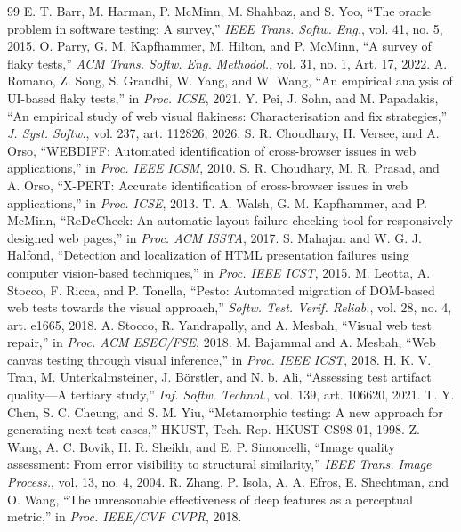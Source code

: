 \documentclass[conference]{IEEEtran}
\begin{document}
\begin{thebibliography}{99}\footnotesize
{} E. T. Barr, M. Harman, P. McMinn, M. Shahbaz, and S. Yoo, ``The oracle problem in software testing: A survey,'' \emph{IEEE Trans. Softw. Eng.}, vol. 41, no. 5, 2015.
 O. Parry, G. M. Kapfhammer, M. Hilton, and P. McMinn, ``A survey of flaky tests,'' \emph{ACM Trans. Softw. Eng. Methodol.}, vol. 31, no. 1, Art. 17, 2022.
 A. Romano, Z. Song, S. Grandhi, W. Yang, and W. Wang, ``An empirical analysis of UI-based flaky tests,'' in \emph{Proc. ICSE}, 2021.
 Y. Pei, J. Sohn, and M. Papadakis, ``An empirical study of web visual flakiness: Characterisation and fix strategies,'' \emph{J. Syst. Softw.}, vol. 237, art. 112826, 2026.
 S. R. Choudhary, H. Versee, and A. Orso, ``WEBDIFF: Automated identification of cross-browser issues in web applications,'' in \emph{Proc. IEEE ICSM}, 2010.
 S. R. Choudhary, M. R. Prasad, and A. Orso, ``X-PERT: Accurate identification of cross-browser issues in web applications,'' in \emph{Proc. ICSE}, 2013.
 T. A. Walsh, G. M. Kapfhammer, and P. McMinn, ``ReDeCheck: An automatic layout failure checking tool for responsively designed web pages,'' in \emph{Proc. ACM ISSTA}, 2017.
 S. Mahajan and W. G. J. Halfond, ``Detection and localization of HTML presentation failures using computer vision-based techniques,'' in \emph{Proc. IEEE ICST}, 2015.
 M. Leotta, A. Stocco, F. Ricca, and P. Tonella, ``Pesto: Automated migration of DOM-based web tests towards the visual approach,'' \emph{Softw. Test. Verif. Reliab.}, vol. 28, no. 4, art. e1665, 2018.
 A. Stocco, R. Yandrapally, and A. Mesbah, ``Visual web test repair,'' in \emph{Proc. ACM ESEC/FSE}, 2018.
 M. Bajammal and A. Mesbah, ``Web canvas testing through visual inference,'' in \emph{Proc. IEEE ICST}, 2018.
 H. K. V. Tran, M. Unterkalmsteiner, J. B\"orstler, and N. b. Ali, ``Assessing test artifact quality---A tertiary study,'' \emph{Inf. Softw. Technol.}, vol. 139, art. 106620, 2021.
 T. Y. Chen, S. C. Cheung, and S. M. Yiu, ``Metamorphic testing: A new approach for generating next test cases,'' HKUST, Tech. Rep. HKUST-CS98-01, 1998.
 Z. Wang, A. C. Bovik, H. R. Sheikh, and E. P. Simoncelli, ``Image quality assessment: From error visibility to structural similarity,'' \emph{IEEE Trans. Image Process.}, vol. 13, no. 4, 2004.
 R. Zhang, P. Isola, A. A. Efros, E. Shechtman, and O. Wang, ``The unreasonable effectiveness of deep features as a perceptual metric,'' in \emph{Proc. IEEE/CVF CVPR}, 2018.

\end{thebibliography}
\end{document}
